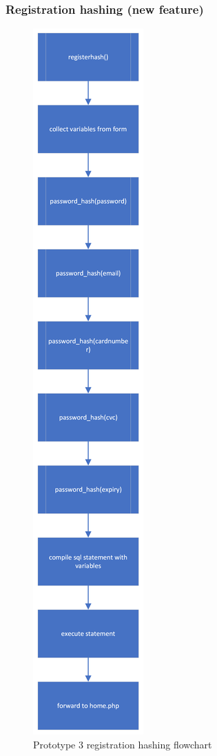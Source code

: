 \subsubsection{Registration hashing (new feature)}
 \begin{figure}[H]
    \centering
    \includegraphics[scale=0.4]{ch3_developing/proto3/flow_register.png}
    \caption{Prototype 3 registration hashing flowchart}
    \label{fig:proto3_hashingflow}
\end{figure}
